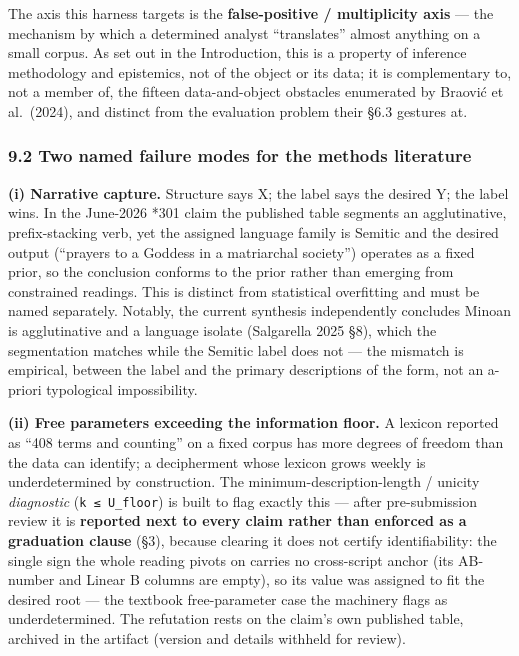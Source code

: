 \documentclass[
  10pt,
]{article}
\begin{document}
The axis this harness targets is the \textbf{false-positive /
multiplicity axis} --- the mechanism by which a determined analyst
``translates'' almost anything on a small corpus. As set out in the
Introduction, this is a property of inference methodology and
epistemics, not of the object or its data; it is complementary to, not a
member of, the fifteen data-and-object obstacles enumerated by Braović
et al.~(2024), and distinct from the evaluation problem their §6.3
gestures at.

\hypertarget{two-named-failure-modes-for-the-methods-literature}{%
\subsubsection{9.2 Two named failure modes for the methods
literature}\label{two-named-failure-modes-for-the-methods-literature}}

\textbf{(i) Narrative capture.} Structure says X; the label says the
desired Y; the label wins. In the June-2026 *301 claim the published
table segments an agglutinative, prefix-stacking verb, yet the assigned
language family is Semitic and the desired output (``prayers to a
Goddess in a matriarchal society'') operates as a fixed prior, so the
conclusion conforms to the prior rather than emerging from constrained
readings. This is distinct from statistical overfitting and must be
named separately. Notably, the current synthesis independently concludes
Minoan is agglutinative and a language isolate (Salgarella 2025 §8),
which the segmentation matches while the Semitic label does not --- the
mismatch is empirical, between the label and the primary descriptions of
the form, not an a-priori typological impossibility.

\textbf{(ii) Free parameters exceeding the information floor.} A lexicon
reported as ``408 terms and counting'' on a fixed corpus has more
degrees of freedom than the data can identify; a decipherment whose
lexicon grows weekly is underdetermined by construction. The
minimum-description-length / unicity \emph{diagnostic}
(\texttt{k\ ≤\ U\_floor}) is built to flag exactly this --- after
pre-submission review it is \textbf{reported next to every claim rather
than enforced as a graduation clause} (§3), because clearing it does not
certify identifiability: the single sign the whole reading pivots on
carries no cross-script anchor (its AB-number and Linear B columns are
empty), so its value was assigned to fit the desired root --- the
textbook free-parameter case the machinery flags as underdetermined. The
refutation rests on the claim's own published table, archived in the
artifact (version and details withheld for review).
\end{document}

